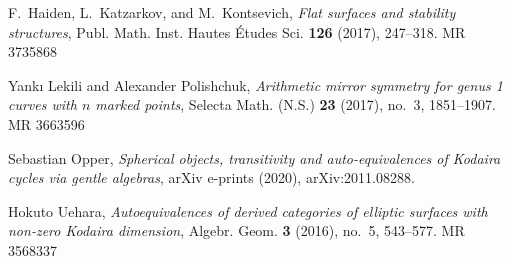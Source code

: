 \documentclass[a0,landscape]{a0poster}
\providecommand{\MR}{\relax\ifhmode\unskip\space\fi MR }
\theoremstyle{plain}
\theoremstyle{definition}
\begin{document}
\begin{multicols}{3}
    \vspace*{-1cm}

    \begin{thebibliography}{99}
        \setlength{\itemsep}{-3pt} %
        {
        \small
        F.~Haiden, L.~Katzarkov, and M.~Kontsevich, \emph{Flat surfaces and stability structures}, Publ. Math. Inst. Hautes \'{E}tudes Sci. \textbf{126} (2017), 247--318. \MR {3735868}

        Yank{\i} Lekili and Alexander Polishchuk, \emph{Arithmetic mirror symmetry for genus 1 curves with {$n$} marked points}, Selecta Math. (N.S.) \textbf{23} (2017), no.~3, 1851--1907. \MR{3663596}

        Sebastian {Opper}, \emph{{Spherical objects, transitivity and auto-equivalences of Kodaira cycles via gentle algebras}}, arXiv e-prints (2020), arXiv:2011.08288.

        Hokuto Uehara, \emph{Autoequivalences of derived categories of elliptic surfaces with non-zero {K}odaira dimension}, Algebr. Geom. \textbf{3} (2016), no.~5, 543--577. \MR{3568337}
        }
    \end{thebibliography}



\end{multicols}
\end{document}
